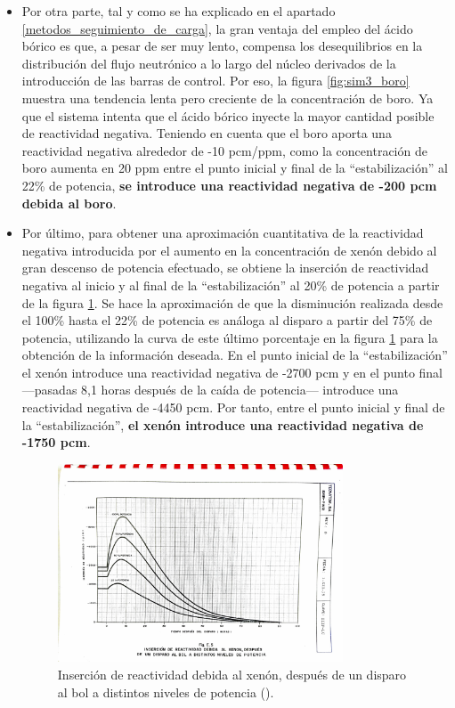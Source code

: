 \begin{itemize}
  \vspace{-0.4cm}
  \item Por otra parte, tal y como se ha explicado en el apartado \ref{metodos_seguimiento_de_carga}, la gran ventaja del empleo del ácido bórico es que, a pesar de ser muy lento, compensa los desequilibrios en la distribución del flujo neutrónico a lo largo del núcleo derivados de la introducción de las barras de control. Por eso, la figura \ref{fig:sim3_boro} muestra una tendencia lenta pero creciente de la concentración de boro. Ya que el sistema intenta que el ácido bórico inyecte la mayor cantidad posible de reactividad negativa. Teniendo en cuenta que el boro aporta una reactividad negativa alrededor de -10 pcm/ppm, como la concentración de boro aumenta en 20 ppm entre el punto inicial y final de la ``estabilización'' al 22\% de potencia, \textbf{se introduce una reactividad negativa de -200 pcm debida al boro}.
  
  \item Por último, para obtener una aproximación cuantitativa de la reactividad negativa introducida por el aumento en la concentración de xenón debido al gran descenso de potencia efectuado, se obtiene la inserción de reactividad negativa al inicio y al final de la ``estabilización'' al 20\% de potencia a partir de la figura \ref{fig:reactividad_xenon_disparo}. Se hace la aproximación de que la disminución realizada desde el 100\% hasta el 22\% de potencia es análoga al disparo a partir del 75\% de potencia, utilizando la curva de este último porcentaje en la figura \ref{fig:reactividad_xenon_disparo} para la obtención de la información deseada. En el punto inicial de la ``estabilización'' el xenón introduce una reactividad negativa de -2700 pcm y en el punto final ---pasadas 8,1 horas después de la caída de potencia--- introduce una reactividad negativa de -4450 pcm. Por tanto, entre el punto inicial y final de la ``estabilización'', \textbf{el xenón introduce una reactividad negativa de -1750 pcm}.
  
  \begin{figure}[!h]
    \centering
    \includegraphics[width=0.8\textwidth]{content/figures/reactividad_xenon_disparo.pdf}
    \caption{Inserción de reactividad debida al xenón, después de un disparo al \acrshort{bol} a distintos niveles de potencia (\cite{documentacion_sgiz}).}
    \label{fig:reactividad_xenon_disparo}
  \end{figure}


\end{itemize}
